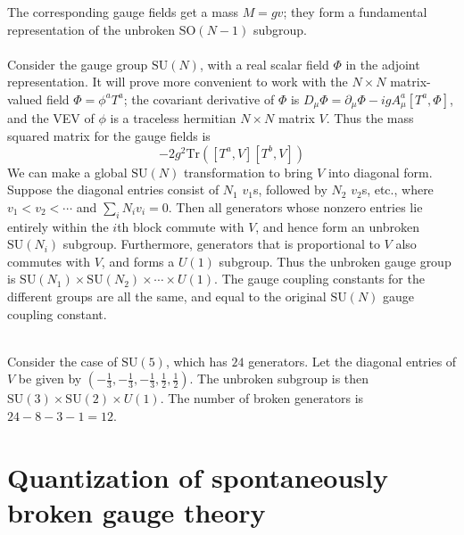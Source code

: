 The corresponding gauge fields get a mass $M = gv$; they form a fundamental representation of the unbroken $\mathrm{SO}(N-1)$ subgroup.
\\ \\
Consider the gauge group $\mathrm{SU}(N)$, with a real scalar field $\Phi$ in the adjoint representation. It will prove more convenient to work with the $N \times N$ matrix-valued field $\Phi = \phi^a T^a$; the covariant derivative of $\Phi$ is $D_{\mu}\Phi = \partial_{\mu}\Phi - igA^a_{\mu}[T^a,\Phi]$,
and the VEV of $\phi$ is a traceless hermitian $N \times N$ matrix $V$. Thus the mass squared matrix for the gauge fields is
\[-2g^2 \mathrm{Tr}\left([T^a,V][T^b,V]\right)\]
We can make a global $\mathrm{SU}(N)$ transformation to bring $V$ into diagonal form. Suppose the diagonal entries consist of $N_1$ $v_1$s, followed by $N_2$ $v_2$s, etc.,
where $v_1 < v_2 < \cdots$ and $\sum_i N_i v_i = 0$. 
Then all generators whose nonzero entries lie entirely within the $i$th block commute with $V$, and hence form an
unbroken $\mathrm{SU}(N_i)$ subgroup. Furthermore, generators that is proportional to $V$ also commutes with $V$, and forms a
$U(1)$ subgroup. Thus the unbroken gauge group is $\mathrm{SU}(N_1)\times \mathrm{SU}(N_2) \times \cdots \times U(1)$. The gauge coupling constants for the different groups are all the same, and equal to the original $\mathrm{SU}(N)$ gauge coupling constant.
\\ \\
\begin{example}
Consider the case of $\mathrm{SU}(5)$, which has $24$ generators. Let the diagonal entries of $V$ be given by $(-\frac{1}{3},-\frac{1}{3},-\frac{1}{3}, \frac{1}{2}, \frac{1}{2})$. The unbroken subgroup is then $\mathrm{SU}(3) \times \mathrm{SU}(2) \times U(1)$. The number of broken generators is $24 - 8 - 3 - 1 = 12$.
\end{example}

\section{Quantization of spontaneously broken gauge theory}
